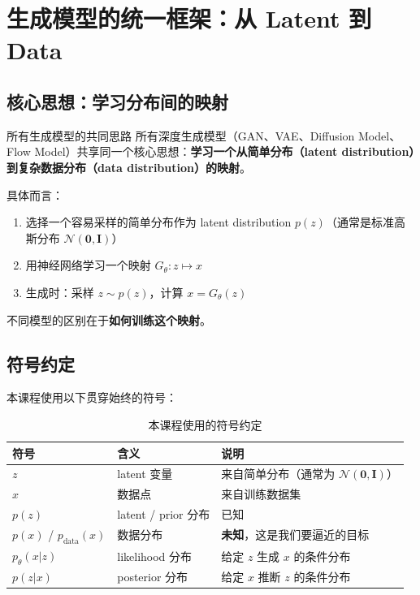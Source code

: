 \section{生成模型的统一框架：从 Latent 到 Data}

\subsection{核心思想：学习分布间的映射}

\begin{importantbox}{所有生成模型的共同思路}
所有深度生成模型（GAN、VAE、Diffusion Model、Flow Model）共享同一个核心思想：\textbf{学习一个从简单分布（latent distribution）到复杂数据分布（data distribution）的映射}。

具体而言：
\begin{enumerate}
    \item 选择一个容易采样的简单分布作为 latent distribution $p(z)$（通常是标准高斯分布 $\mathcal{N}(\mathbf{0}, \mathbf{I})$）
    \item 用神经网络学习一个映射 $G_\theta: z \mapsto x$
    \item 生成时：采样 $z \sim p(z)$，计算 $x = G_\theta(z)$
\end{enumerate}
不同模型的区别在于\textbf{如何训练这个映射}。
\end{importantbox}

\subsection{符号约定}

本课程使用以下贯穿始终的符号：

\begin{table}[H]
\centering
\begin{tabular}{lll}
\toprule
符号 & 含义 & 说明 \\
\midrule
$z$ & latent 变量 & 来自简单分布（通常为 $\mathcal{N}(\mathbf{0}, \mathbf{I})$） \\
$x$ & 数据点 & 来自训练数据集 \\
$p(z)$ & latent / prior 分布 & 已知 \\
$p(x)$ / $p_{\text{data}}(x)$ & 数据分布 & \textbf{未知}，这是我们要逼近的目标 \\
$p_\theta(x|z)$ & likelihood 分布 & 给定 $z$ 生成 $x$ 的条件分布 \\
$p(z|x)$ & posterior 分布 & 给定 $x$ 推断 $z$ 的条件分布 \\
\bottomrule
\end{tabular}
\caption{本课程使用的符号约定}
\end{table}

